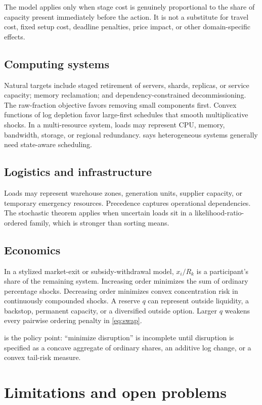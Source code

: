 \documentclass[pdflatex,iicol,sn-basic]{sn-jnl}
\theoremstyle{thmstyleone}
\theoremstyle{thmstyletwo}
\theoremstyle{thmstylethree}
\begin{document}
The model applies only when stage cost is genuinely proportional to the share of
capacity present immediately before the action. It is not a substitute for
travel cost, fixed setup cost, deadline penalties, price impact, or other
domain-specific effects.

\subsection{Computing systems}
Natural targets include staged retirement of servers, shards, replicas, or
service capacity; memory reclamation; and dependency-constrained
decommissioning. The raw-fraction objective favors removing small components
first. Convex functions of log depletion favor large-first schedules that smooth
multiplicative shocks. In a multi-resource system, loads may represent CPU,
memory, bandwidth, storage, or regional redundancy.  says
heterogeneous systems generally need state-aware scheduling.

\subsection{Logistics and infrastructure}
Loads may represent warehouse zones, generation units, supplier capacity, or
temporary emergency resources. Precedence captures operational dependencies. The
stochastic theorem applies when uncertain loads sit in a likelihood-ratio-ordered
family, which is stronger than sorting means.

\subsection{Economics}
In a stylized market-exit or subsidy-withdrawal model, \(x_i/R_k\) is a
participant's share of the remaining system. Increasing order minimizes the sum
of ordinary percentage shocks. Decreasing order minimizes convex concentration
risk in continuously compounded shocks. A reserve \(q\) can represent outside
liquidity, a backstop, permanent capacity, or a diversified outside option.
Larger \(q\) weakens every pairwise ordering penalty in \eqref{eq:swap}.

 is the policy point: ``minimize disruption'' is incomplete until
disruption is specified as a concave aggregate of ordinary shares, an additive
log change, or a convex tail-risk measure.

\section{Limitations and open problems}
\label{sec:open}
\end{document}
